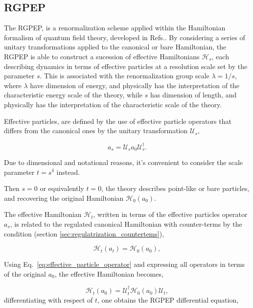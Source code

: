 \documentclass[11pt,a4paper,twoside,pdf]{article}
\numberwithin{equation}{section}
\begin{document}
\subsection{RGPEP}
The RGPEP, is a renormalization scheme applied within the Hamiltonian formalism 
of quantum field theory, developed in Refs.\cite{PhysRevD.48.5863 ,glazek_dynamics_2001, PEP}. 
By considering a series of unitary transformations applied to the
canonical or bare Hamiltonian, the RGPEP is able to construct a sucession of effective 
Hamiltonians $\mathcal{H}_s$, each describing dynamics in terms of effective particles 
at a resolution scale set by the parameter \( s \). This is associated with the 
renormalization group scale $\lambda = 1/s$, where  $\lambda$ have dimension of energy,
and physically has the interpretation of the characteristic energy scale of the theory, 
while \( s \) has dimension of length, and physically 
has the interpretation of the characteristic scale of the theory.

Effective particles, are defined by the use of effective particle 
operators that differs from the canonical ones by the unitary transformation 
$\mathcal{U}_s$,

\begin{equation}
    a_s = \mathcal{U}_sa_0\mathcal{U}_s^\dagger.
    \label{eq:effective_particle_operator}
\end{equation}

Due to dimensional and notational reasons, it's convenient to consider the scale 
parameter $t = s^4$ instead.

Then $s=0$ or equivalently $t=0$, the theory describes  point-like or bare particles, 
and recovering the original Hamiltonian $\mathcal{H}_0(a_0)$.

The effective Hamiltonian $\mathcal{H}_t$, written in terms of the effective particles
operator $a_s$, is related to the regulated canonical Hamiltonian with counter-terms 
by the condition (section \ref{sec:regulatrization_countertems}),

\begin{equation}
    \mathcal{H}_t(a_t) = \mathcal{H}_0(a_0),
\end{equation}

Using Eq.~\eqref{eq:effective_particle_operator} and expressing all operators in 
terms of the original \( a_0 \), the effective Hamiltonian becomes,

\begin{equation}
    \mathcal{H}_t(a_0) = \mathcal{U}_t^\dagger\mathcal{H}_0(a_0) \mathcal{U}_t,
\end{equation}
differentiating with respect of $t$, one obtains the RGPEP differential equation,
\end{document}
